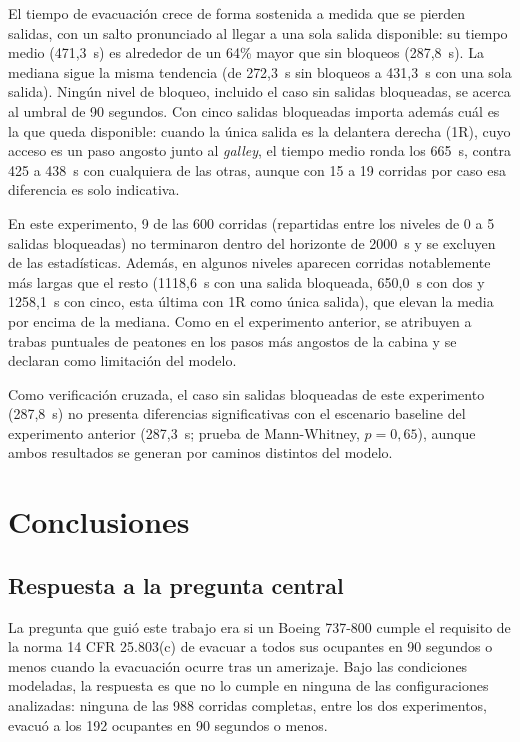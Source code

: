 \documentclass[a4paper, 11pt]{article}
\newif\ifmostraravisos
\newcommand{\pendiente}{%
  \ifmostraravisos
    \par\medskip\noindent
    \colorbox{yellow}{\parbox{\dimexpr\linewidth-2\fboxsep\relax}{\small\textbf{[ESTOS DATOS SON ANTES DE TERMINAR EL PROYECTO, UNA VEZ TERMINADO VOLVER A ESCRIBIR ESTA CONCLUSIÓN/FOTO]}}}%
    \par\medskip
  \fi}
\begin{document}
El tiempo de evacuaci\'on crece de forma sostenida a medida que se pierden salidas,
con un salto pronunciado al llegar a una sola salida disponible: su tiempo medio
(471,3~s) es alrededor de un 64\% mayor que sin bloqueos (287,8~s). La mediana sigue
la misma tendencia (de 272,3~s sin bloqueos a 431,3~s con una sola salida). Ning\'un
nivel de bloqueo, incluido el caso sin salidas bloqueadas, se acerca al umbral de 90
segundos. Con cinco salidas bloqueadas importa adem\'as cu\'al es la que queda
disponible: cuando la \'unica salida es la delantera derecha (1R), cuyo acceso es un
paso angosto junto al \textit{galley}, el tiempo medio ronda los 665~s, contra 425 a
438~s con cualquiera de las otras, aunque con 15 a 19 corridas por caso esa
diferencia es solo indicativa.

En este experimento, 9 de las 600 corridas (repartidas entre los niveles de 0 a 5
salidas bloqueadas) no terminaron dentro del horizonte de 2000~s y se excluyen de las
estad\'isticas. Adem\'as, en algunos niveles aparecen corridas notablemente m\'as
largas que el resto (1118,6~s con una salida bloqueada, 650,0~s con dos y 1258,1~s
con cinco, esta \'ultima con 1R como \'unica salida), que elevan la media por encima
de la mediana. Como en el experimento anterior, se atribuyen a trabas puntuales de
peatones en los pasos m\'as angostos de la cabina y se declaran como limitaci\'on
del modelo.

Como verificaci\'on cruzada, el caso sin salidas bloqueadas de este experimento
(287,8~s) no presenta diferencias significativas con el escenario baseline del
experimento anterior (287,3~s; prueba de Mann-Whitney, $p = 0{,}65$), aunque ambos
resultados se generan por caminos distintos del modelo.

\newpage
\section{Conclusiones}

\subsection{Respuesta a la pregunta central}

\pendiente

La pregunta que gui\'o este trabajo era si un Boeing 737-800 cumple el requisito de
la norma 14 CFR 25.803(c) de evacuar a todos sus ocupantes en 90 segundos o menos
cuando la evacuaci\'on ocurre tras un amerizaje. Bajo las condiciones modeladas, la
respuesta es que no lo cumple en ninguna de las configuraciones analizadas:
ninguna de las 988 corridas completas, entre los dos experimentos, evacu\'o a los
192 ocupantes en 90 segundos o menos.
\end{document}

